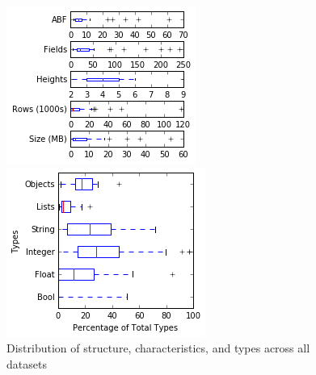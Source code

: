 \documentclass{sig-alternate}
\begin{document}
\begin{figure}[ht!]
    \centering
    \begin{minipage}[b]{0.225\textwidth}
    \includegraphics[width=\textwidth]{graphics/characteristics-graph}
    \end{minipage}
    \hfill
    \begin{minipage}[b]{0.225\textwidth}
    \includegraphics[width=\textwidth]{graphics/type-percentages}
    \end{minipage}
    \caption{Distribution of structure, characteristics, and types across all datasets}
    \label{fig:metrics}
\end{figure}
\end{document}
